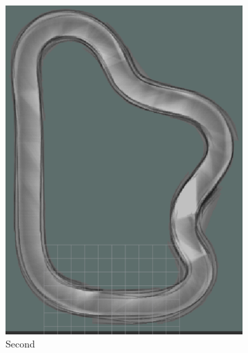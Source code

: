 \begin{figure}[H]
\begin{subfigure}{.3\linewidth}
		\includegraphics[width=\textwidth]{Pictures/1slamtest2}
		\caption{Second}
	\end{subfigure}
	\begin{subfigure}{.3\linewidth}

\end{subfigure}
\end{figure}
